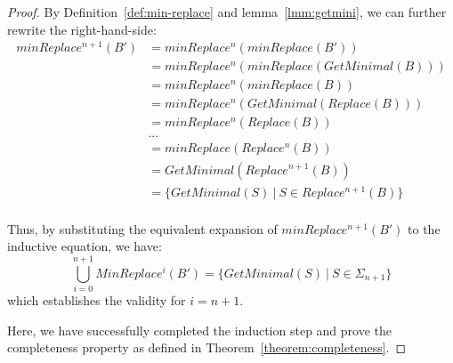 \begin{proof}
By Definition~\ref{def:min-replace} and lemma~\ref{lmm:getmini}, we can further rewrite the right-hand-side: 
\begin{align*}
    minReplace^{n+1}(B') & = minReplace^n(minReplace(B')) \\
                    & = minReplace^n(minReplace(GetMinimal(B))) \\
                    & = minReplace^n(minReplace(B)) \\
                    & = minReplace^n(GetMinimal(Replace(B))) \\
                    & = minReplace^n(Replace(B)) \\
                    & ... \\
                    & = minReplace(Replace^{n}(B)) \\
                    & = GetMinimal(Replace^{n+1}(B)) \\
                    & = \{ GetMinimal(S) ~|~ S \in Replace^{n+1}(B) \} \\
\end{align*}

Thus, by substituting the equivalent expansion of $minReplace^{n+1}(B')$ to the inductive equation,
we have:
\[
    \bigcup_{i=0}^{n+1}MinReplace^i(B') = \{ GetMinimal(S) ~|~ S \in \Sigma_{n+1} \}
\]
which establishes the validity for $i=n+1$.

Here, we have successfully completed the induction step and prove the completeness property
as defined in Theorem~\ref{theorem:completeness}.
\end{proof}

